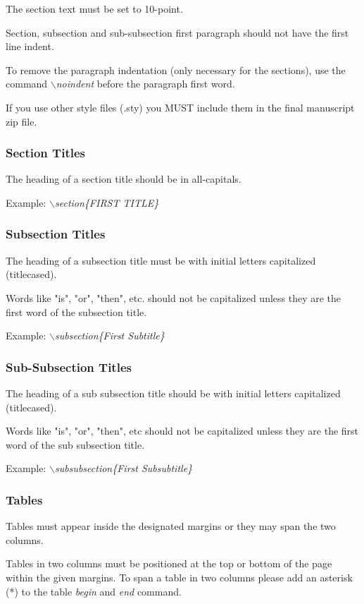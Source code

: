 \documentclass[a4paper,twoside]{article}
\begin{document}
The section text must be set to 10-point.

Section, subsection and sub-subsection first paragraph should not
have the first line indent.

To remove the paragraph indentation (only necessary for the
sections), use the command \textit{$\backslash$noindent} before the
paragraph first word.

If you use other style files (.sty) you MUST include them in the
final manuscript zip file.

\subsubsection{Section Titles}

The heading of a section title should be in all-capitals.

Example: \textit{$\backslash$section\{FIRST TITLE\}}

\vfill
\subsubsection{Subsection Titles}

The heading of a subsection title must be with initial letters
capitalized (titlecased).

Words like "is", "or", "then", etc. should not be capitalized unless
they are the first word of the subsection title.

Example: \textit{$\backslash$subsection\{First Subtitle\}}

\subsubsection{Sub-Subsection Titles}

The heading of a sub subsection title should be with initial letters
capitalized (titlecased).

Words like "is", "or", "then", etc should not be capitalized unless
they are the first word of the sub subsection title.

Example: \textit{$\backslash$subsubsection\{First Subsubtitle\}}

\subsubsection{Tables}

Tables must appear inside the designated margins or they may span
the two columns.

Tables in two columns must be positioned at the top or bottom of the
page within the given margins. To span a table in two columns please add an asterisk (*) to the table \textit{begin} and \textit{end} command.
\end{document}
